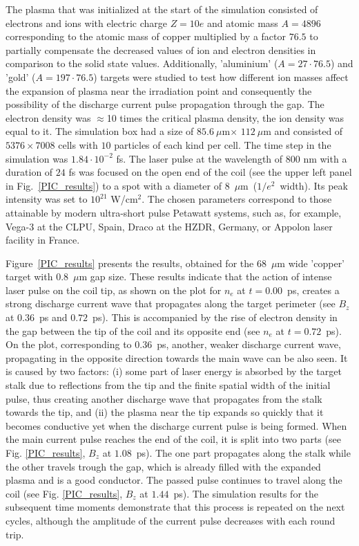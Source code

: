 \documentclass[aps,prl,twocolumn,superscriptaddress]{revtex4-1}
\begin{document}
The plasma that was initialized at the start of the simulation consisted of electrons and ions with electric charge $Z=10e$ and atomic mass $A=4896$ corresponding to the atomic mass of copper multiplied by a factor $76.5$ to partially compensate the decreased values of ion and electron densities in comparison to the solid state values. Additionally, 'aluminium' ($A=27 \cdot 76.5$) and 'gold' ($A=197 \cdot 76.5$) targets were studied to test how different ion masses affect the expansion of plasma near the irradiation point and consequently the possibility of the discharge current pulse propagation through the gap. The electron density was $\approx$10 times the critical plasma density, the ion density was equal to it. The simulation box had a size of $85.6~\mu$m$\times$ $112~\mu$m and consisted of $5376 \times 7008$ cells with $10$ particles of each kind per cell. The time step in the simulation was $1.84 \cdot 10^{-2}$ fs. The laser pulse at the wavelength of $800$ nm with a duration of $24$ fs was focused on the open end of the coil (see the upper left panel in Fig.~\ref{PIC_results}) to a spot with a diameter of 8~$\mu$m~($1/e^2$~width). Its peak intensity was set to $10^{21}$ W/cm$^2$. The chosen parameters correspond to those attainable by modern ultra-short pulse Petawatt systems, such as, for example, Vega-3 at the CLPU, Spain, Draco at the HZDR, Germany, or Appolon laser facility in France. 

Figure~\ref{PIC_results} presents the results, obtained for the $68$~$\mu$m wide 'copper' target with $0.8$~$\mu$m gap size. These results indicate that the action of intense laser pulse on the coil tip, as shown on the plot for $n_e$ at $t=0.00$~ps, creates a strong discharge current wave that propagates along the target perimeter (see $B_z$ at $0.36$~ps and $0.72$~ps). This is accompanied by the rise of electron density in the gap between the tip of the coil and its opposite end (see $n_e$ at $t=0.72$~ps). On the plot, corresponding to $0.36$~ps, another, weaker discharge current wave, propagating in the opposite direction towards the main wave can be also seen. It is caused by two factors: (i) some part of laser energy is absorbed by the target stalk due to reflections from the tip and the finite spatial width of the initial pulse, thus creating another discharge wave that propagates from the stalk towards the tip, and (ii) the plasma near the tip expands so quickly that it becomes conductive yet when the discharge current pulse is being formed. When the main current pulse reaches the end of the coil, it is split into two parts (see Fig. \ref{PIC_results}, $B_z$ at $1.08$~ps). The one part propagates along the stalk while the other travels trough the gap, which is already filled with the expanded plasma and is a good conductor. The passed pulse continues to travel along the coil (see Fig. \ref{PIC_results}, $B_z$ at $1.44$~ps). The simulation results for the subsequent time moments demonstrate that this process is repeated on the next cycles, although the amplitude of the current pulse decreases with each round trip.
\end{document}
